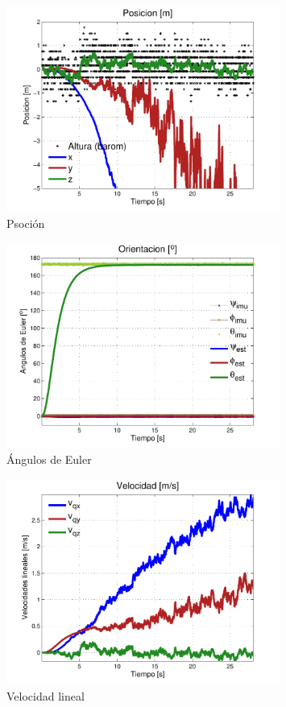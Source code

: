 \documentclass[main]{subfiles}
\begin{document}
\begin{figure}[h!]
	\centering
	\includegraphics[width=0.8\textwidth]{./pics_kalman/pos.pdf}
	\caption{Psoción}
	\label{fig:pos}
\end{figure}
\begin{figure}[h!]
	\centering
	\includegraphics[width=0.8\textwidth]{./pics_kalman/euler.pdf}
	\caption{Ángulos de Euler}
	\label{fig:euler}
\end{figure}
\begin{figure}[h!]
	\centering
	\includegraphics[width=0.8\textwidth]{./pics_kalman/vq.pdf}
	\caption{Velocidad lineal}
	\label{fig:vq}
\end{figure}
\end{document}
